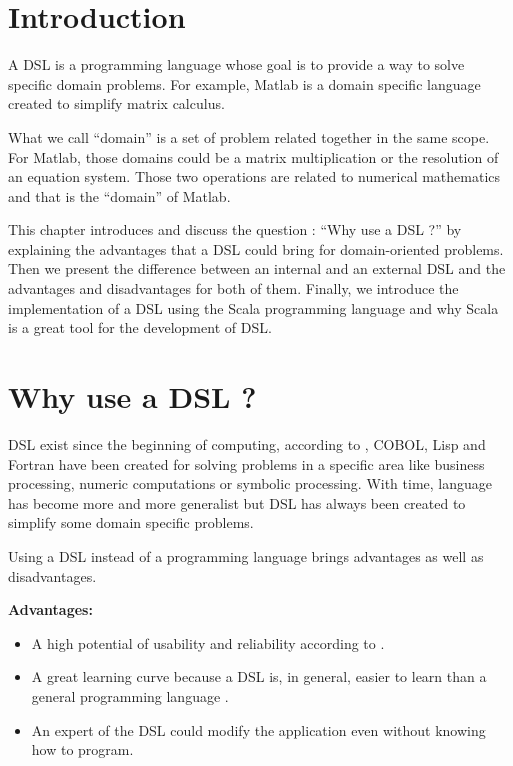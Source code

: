 \label{cha:a-dsl}

\section{Introduction}
\label{sec:dsl_intro}

A \gls{DSL} is a programming language whose goal is
to provide a way to solve specific domain problems. For example, Matlab is a
domain specific language created to simplify matrix calculus.

What we call ``domain'' is a set of problem related together in the same scope.
For Matlab, those domains could be a matrix multiplication or the resolution of an
equation system. Those two operations are related to numerical mathematics and
that is the ``domain'' of Matlab.

This chapter introduces and discuss the question : ``Why use a DSL ?'' by
explaining the advantages that a \gls{DSL} could bring for domain-oriented
problems. Then we present the difference between an internal and an external DSL
and the advantages and disadvantages for both of them. Finally, we introduce the
implementation of a \gls{DSL} using the Scala programming language and why Scala
is a great tool for the development of \gls{DSL}.

\section{Why use a DSL ?}
\label{sec:why-use-dsl}

\gls{DSL} exist since the beginning of computing, according to
\cite{VanDeursen2000}, COBOL, Lisp and Fortran have been
created for solving problems in a specific area like business processing, numeric
computations or symbolic processing. With time, language has become more and
more generalist but \gls{DSL} has always been created to simplify some domain
specific problems.

Using a DSL instead of a programming language brings advantages as well as
disadvantages.

\textbf{Advantages:}
\begin{itemize}
\item A high potential of usability and reliability according to
  \cite{Tolvanen2010}.
\item A great learning curve because a DSL is, in general, easier to learn than a
  general programming language \cite{Mernik2005}.
\item An expert of the DSL could modify the application even without knowing how
  to program.
\end{itemize}

